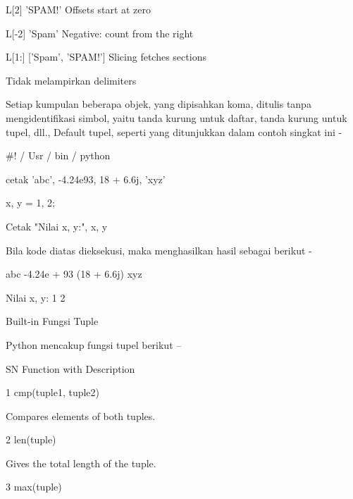 L[2] \hspace*{0.5in} 'SPAM!' \hspace*{0.5in} Offsets start at zero \par
L[-2] \hspace*{0.5in} 'Spam' \hspace*{0.5in} Negative: count from the right \par
L[1:] \hspace*{0.5in} ['Spam', 'SPAM!'] \hspace*{0.5in} Slicing fetches sections \par
\vspace{12pt}
Tidak melampirkan delimiters \par
Setiap kumpulan beberapa objek, yang dipisahkan koma, ditulis tanpa mengidentifikasi simbol, yaitu tanda kurung untuk daftar, tanda kurung untuk tupel, dll., Default tupel, seperti yang ditunjukkan dalam contoh singkat ini - \par
 $  \#  $! / Usr / bin / python \par
\vspace{12pt}
cetak 'abc', -4.24e93, 18 + 6.6j, 'xyz' \par
x, y = 1, 2; \par
Cetak "Nilai x, y:", x, y \par
Bila kode diatas dieksekusi, maka menghasilkan hasil sebagai berikut - \par
abc -4.24e + 93 (18 + 6.6j) xyz \par
Nilai x, y: 1 2 \par
Built-in Fungsi Tuple \par
Python mencakup fungsi tupel berikut – \par
\vspace{12pt}
\vspace{12pt}
\vspace{12pt}
SN \hspace*{0.5in} Function with Description \par
1 \hspace*{0.5in} cmp(tuple1, tuple2) \par
\vspace{12pt}
Compares elements of both tuples. \par
2 \hspace*{0.5in} len(tuple) \par
\vspace{12pt}
Gives the total length of the tuple. \par
3 \hspace*{0.5in} max(tuple) \par
